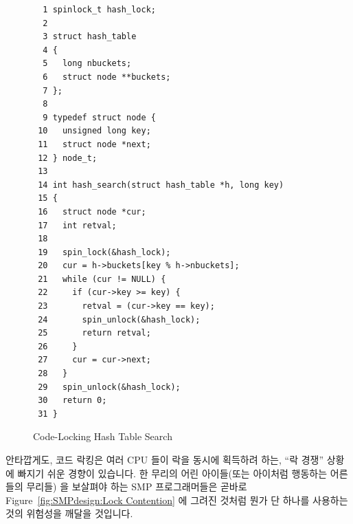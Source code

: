 \begin{figure}[htbp]
{ \scriptsize
\begin{verbatim}
  1 spinlock_t hash_lock;
  2
  3 struct hash_table
  4 {
  5   long nbuckets;
  6   struct node **buckets;
  7 };
  8
  9 typedef struct node {
 10   unsigned long key;
 11   struct node *next;
 12 } node_t;
 13
 14 int hash_search(struct hash_table *h, long key)
 15 {
 16   struct node *cur;
 17   int retval;
 18
 19   spin_lock(&hash_lock);
 20   cur = h->buckets[key % h->nbuckets];
 21   while (cur != NULL) {
 22     if (cur->key >= key) {
 23       retval = (cur->key == key);
 24       spin_unlock(&hash_lock);
 25       return retval;
 26     }
 27     cur = cur->next;
 28   }
 29   spin_unlock(&hash_lock);
 30   return 0;
 31 }
\end{verbatim}
}
\caption{Code-Locking Hash Table Search}
\label{fig:SMPdesign:Code-Locking Hash Table Search}
\end{figure}

안타깝게도, 코드 락킹은 여러 CPU 들이 락을 동시에 획득하려 하는, ``락 경쟁''
상황에 빠지기 쉬운 경향이 있습니다.
한 무리의 어린 아이들(또는 아이처럼 행동하는 어른들의 무리들) 을 보살펴야 하는
SMP 프로그래머들은 곧바로 Figure~\ref{fig:SMPdesign:Lock Contention} 에 그려진
것처럼 뭔가 단 하나를 사용하는 것의 위험성을 깨달을 것입니다.

